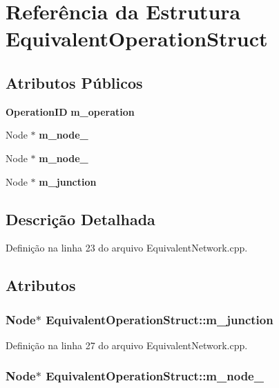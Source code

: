 \section{Referência da Estrutura Equivalent\+Operation\+Struct}
\label{struct_equivalent_operation_struct}
\subsection*{Atributos Públicos}
\begin{DoxyCompactItemize}
\item 
{\bf Operation\+ID} {\bf m\+\_\+operation}
\item 
Node $\ast$ {\bf m\+\_\+node\+\_}
\item 
Node $\ast$ {\bf m\+\_\+node\+\_}
\item 
Node $\ast$ {\bf m\+\_\+junction}
\end{DoxyCompactItemize}


\subsection{Descrição Detalhada}


Definição na linha 23 do arquivo Equivalent\+Network.\+cpp.



\subsection{Atributos}
\subsubsection[{m\+\_\+junction}]{\setlength{\rightskip}{0pt plus 5cm}Node$\ast$ Equivalent\+Operation\+Struct\+::m\+\_\+junction}\label{struct_equivalent_operation_struct_ae2c4d821920c88e55127589f87c3328a}


Definição na linha 27 do arquivo Equivalent\+Network.\+cpp.

\subsubsection[{m\+\_\+node\+\_\+1}]{\setlength{\rightskip}{0pt plus 5cm}Node$\ast$ Equivalent\+Operation\+Struct\+::m\+\_\+node\+\_}\label{struct_equivalent_operation_struct_a2a0286f56e9d88a9da52280b2e697ba4}


